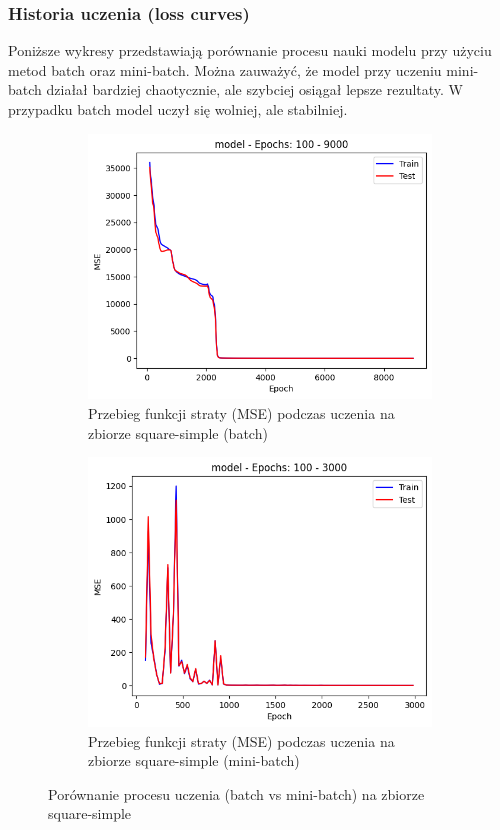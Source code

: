\documentclass{article}
\begin{document}
\subsubsection*{Historia uczenia (loss curves)}
Poniższe wykresy przedstawiają porównanie procesu nauki modelu przy użyciu metod batch oraz mini-batch. Można zauważyć, że model przy uczeniu mini-batch działał bardziej chaotycznie, ale szybciej osiągał lepsze rezultaty. W przypadku batch model uczył się wolniej, ale stabilniej.
\begin{figure}[H]
    \centering
    \begin{subfigure}[b]{0.48\textwidth}
        \centering
        \includegraphics[width=\textwidth]{img/nn2/square-simple_batch_training_history.png}
        \caption{Przebieg funkcji straty (MSE) podczas uczenia na zbiorze square-simple (batch)}
    \end{subfigure}
    \hfill
    \begin{subfigure}[b]{0.48\textwidth}
        \centering
        \includegraphics[width=\textwidth]{img/nn2/square-simple_mini-batch_training_history.png}
        \caption{Przebieg funkcji straty (MSE) podczas uczenia na zbiorze square-simple (mini-batch)}
    \end{subfigure}
    \caption{Porównanie procesu uczenia (batch vs mini-batch) na zbiorze square-simple}
\end{figure}
\end{document}
